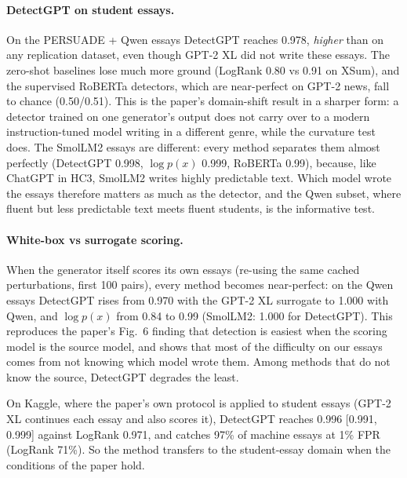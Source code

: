 \documentclass[11pt]{article}
\begin{document}
\paragraph{DetectGPT on student essays.} On the PERSUADE + Qwen essays DetectGPT reaches 0.978, \emph{higher} than on any replication dataset, even though GPT-2 XL did not write these essays. The zero-shot baselines lose much more ground (LogRank 0.80 vs 0.91 on XSum), and the supervised RoBERTa detectors, which are near-perfect on GPT-2 news, fall to chance (0.50/0.51). This is the paper's domain-shift result in a sharper form: a detector trained on one generator's output does not carry over to a modern instruction-tuned model writing in a different genre, while the curvature test does. The SmolLM2 essays are different: every method separates them almost perfectly (DetectGPT 0.998, $\log p(x)$ 0.999, RoBERTa 0.99), because, like ChatGPT in HC3, SmolLM2 writes highly predictable text. Which model wrote the essays therefore matters as much as the detector, and the Qwen subset, where fluent but less predictable text meets fluent students, is the informative test.

\paragraph{White-box vs surrogate scoring.} When the generator itself scores its own essays (re-using the same cached perturbations, first 100 pairs), every method becomes near-perfect: on the Qwen essays DetectGPT rises from 0.970 with the GPT-2 XL surrogate to 1.000 with Qwen, and $\log p(x)$ from 0.84 to 0.99 (SmolLM2: 1.000 for DetectGPT). This reproduces the paper's Fig.~6 finding that detection is easiest when the scoring model is the source model, and shows that most of the difficulty on our essays comes from not knowing which model wrote them. Among methods that do not know the source, DetectGPT degrades the least.

On Kaggle, where the paper's own protocol is applied to student essays (GPT-2 XL continues each essay and also scores it), DetectGPT reaches 0.996 [0.991, 0.999] against LogRank 0.971, and catches 97\% of machine essays at 1\% FPR (LogRank 71\%). So the method transfers to the student-essay domain when the conditions of the paper hold.
\end{document}
